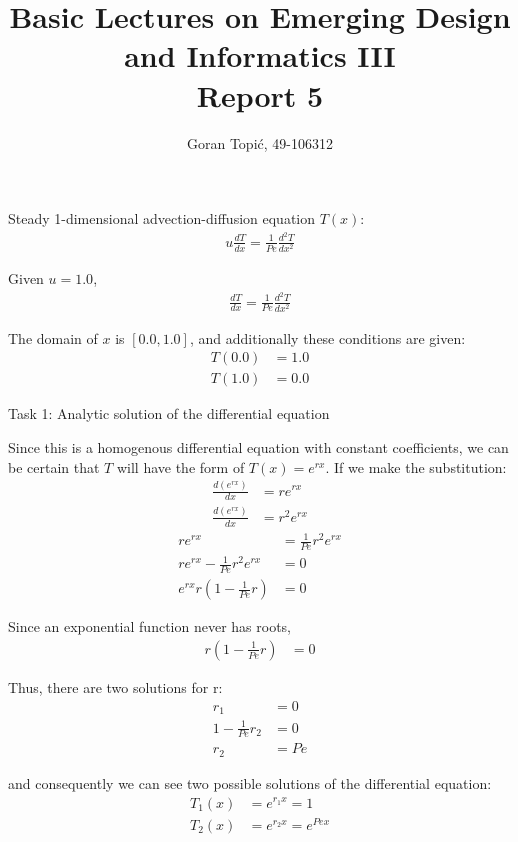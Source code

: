 \documentclass{article}
\begin{document}
\title{Basic Lectures on Emerging Design and Informatics III\\
Report 5}

\author{Goran Topi\'{c}, 49-106312}
\maketitle

Steady 1-dimensional advection-diffusion equation $T(x)$:
\begin{align}
  u\frac{dT}{dx} = \frac{1}{Pe}\frac{d^2 T}{dx^2}
\end{align}

Given $u=1.0$,
\begin{align}
  \frac{dT}{dx} = \frac{1}{Pe}\frac{d^2 T}{dx^2}
\end{align}

The domain of $x$ is $[0.0, 1.0]$, and additionally these conditions are given:
\begin{align}
  \label{cond1} T(0.0) &= 1.0 \\
  \label{cond2} T(1.0) &= 0.0
\end{align}

Task 1: Analytic solution of the differential equation

Since this is a homogenous differential equation with constant coefficients, we can be certain that $T$ will have the form of $T(x) = e^{rx}$. If we make the substitution:
\begin{align}
  \frac{d(e^{rx})}{dx} &= re^{rx} \\
  \frac{d(e^{rx})}{dx} &= r^2 e^{rx}
\end{align}
\begin{align}
  re^{rx} &= \frac{1}{Pe} r^2 e^{rx} \\
  re^{rx} - \frac{1}{Pe} r^2 e^{rx} &= 0 \\
  e^{rx} r (1 - \frac{1}{Pe} r) &= 0
\end{align}

Since an exponential function never has roots,
\begin{align}
  r (1 - \frac{1}{Pe} r) &= 0
\end{align}

Thus, there are two solutions for r:
\begin{align}
  r_1 &= 0 \\
  1 - \frac{1}{Pe} r_2 &= 0 \\
  r_2 &= Pe
\end{align}

and consequently we can see two possible solutions of the differential equation:
\begin{align}
  T_1(x) &= e^{r_1 x} = 1 \\
  T_2(x) &= e^{r_2 x} = e^{Pe x}
\end{align}
\end{document}

